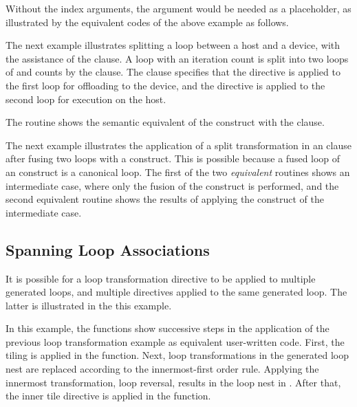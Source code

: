 \pagebreak
{}

Without the index arguments, the  argument would
be needed as a placeholder, as illustrated by the equivalent codes
of the above example as follows.

\pagebreak
{}

The next example illustrates splitting a loop between a host and a device,
with the assistance of the  clause.
A loop with an iteration count  is split into two loops of  and 
 counts by the  clause. The 
 clause specifies that the  
directive is applied to the first loop for offloading to the device, 
and the 
directive is applied to the second loop for execution on the host.

The  routine shows the semantic 
equivalent of the  construct with the  clause.


The next example illustrates the application of a split transformation 
in an 
clause after fusing two loops with a  construct.
This is possible because a fused loop of an  construct is 
a canonical loop.
The first of the two \emph{equivalent} routines shows an intermediate case, where
only the fusion of the  construct is performed, and the second equivalent routine
shows the results of applying the  construct of the intermediate case.



\subsection{Spanning Loop Associations}

It is possible for a loop transformation directive to be applied to multiple generated loops,
and multiple directives applied to the same generated loop.
The latter is illustrated in the this example.


In this example, the functions show successive steps in the application of
the previous loop transformation example as equivalent user-written code.
First, the tiling is applied in the  function.
Next, loop transformations in the generated loop nest are replaced according to the innermost-first order rule.
Applying the innermost transformation, loop reversal, results in the loop nest in .
After that, the inner tile directive is applied in the  function.

